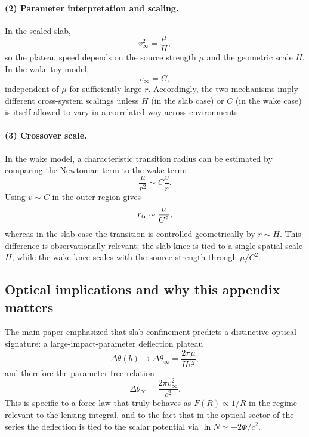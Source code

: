 \documentclass[11pt]{article}
\begin{document}
\paragraph{(2) Parameter interpretation and scaling.}
In the sealed slab,
\begin{equation}
  v_\infty^2=\frac{\mu}{H},
\end{equation}
so the plateau speed depends on the source strength $\mu$ and the geometric scale $H$.
In the wake toy model,
\begin{equation}
  v_\infty=C,
\end{equation}
independent of $\mu$ for sufficiently large $r$.
Accordingly, the two mechanisms imply different cross-system scalings unless $H$ (in the slab case)
or $C$ (in the wake case) is itself allowed to vary in a correlated way across environments.

\paragraph{(3) Crossover scale.}
In the wake model, a characteristic transition radius can be estimated by comparing the Newtonian
term to the wake term:
\begin{equation}
  \frac{\mu}{r^2}\sim C\frac{v}{r}.
\end{equation}
Using $v\sim C$ in the outer region gives
\begin{equation}
  r_{\rm tr}\sim \frac{\mu}{C^2},
\end{equation}
whereas in the slab case the transition is controlled geometrically by $r\sim H$.
This difference is observationally relevant: the slab knee is tied to a single spatial scale $H$,
while the wake knee scales with the source strength through $\mu/C^2$.

\subsection{Optical implications and why this appendix matters}

The main paper emphasized that slab confinement predicts a distinctive optical signature:
a large-impact-parameter deflection plateau
\begin{equation}
  \Delta\theta(b)\to \Delta\theta_\infty=\frac{2\pi \mu}{Hc^2},
\end{equation}
and therefore the parameter-free relation
\begin{equation}
  \Delta\theta_\infty=\frac{2\pi v_\infty^2}{c^2}.
\end{equation}
This is specific to a force law that truly behaves as $F(R)\propto 1/R$ in the regime relevant to the
lensing integral, and to the fact that in the optical sector of the series the deflection is tied to
the scalar potential via $\ln N\simeq -2\Phi/c^2$.
\end{document}
